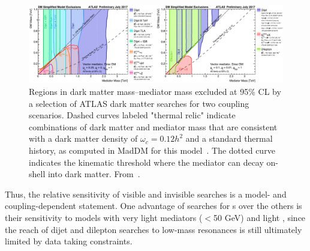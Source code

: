 \begin{figure}[!htpb]
\includegraphics[width=\textwidth]{figures/SummaryPlotsMassMass.pdf}\caption{
Regions in dark matter mass--\Zprime mediator mass excluded at 95\% CL by a selection of ATLAS dark matter searches for two coupling scenarios. Dashed curves labeled "thermal relic" indicate combinations of dark matter and mediator mass that are consistent with a dark matter density of $\omega_c = 0.12 h^2$ and a standard thermal history, as computed in MadDM for this model~\cite{Backovic:2015cra}. The dotted curve indicates the kinematic threshold where the mediator can decay on-shell into dark matter. From~\cite{ATLASSummary}.}
\label{fig:sensitivityComparison}
\end{figure}


Thus, the relative sensitivity of visible and invisible searches is a model- and coupling-dependent statement.
One advantage of searches for {\IP}s over the others is their sensitivity to models with very light mediators ($<$50 GeV) and light \mdm, since the reach of dijet and dilepton searches to low-mass resonances is still ultimately limited by data taking constraints. 
